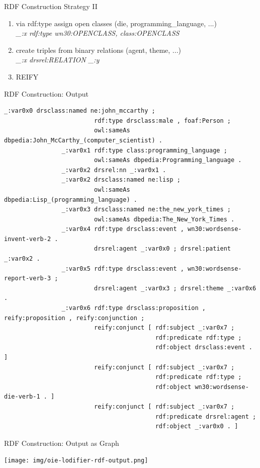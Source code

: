\documentclass[11pt]{beamer}
\begin{document}
		\begin{frame}{RDF Construction Strategy II}
			\begin{enumerate}							
				\item<1-3> via rdf:type assign open classes (die, programming\_language, ...)\\
					\textit{\_:x rdf:type wn30:OPENCLASS, class:OPENCLASS}
				\item<2-3> create triples from binary relations (agent, theme, ...)\\
					\textit{\_:x drsrel:RELATION \_:y}
				\item<3> REIFY
			\end{enumerate}
		\end{frame}

		\begin{frame}[fragile]{RDF Construction: Output}
			\begin{Verbatim}[fontsize=\tiny]
				_:var0x0 drsclass:named ne:john_mccarthy ;
				         rdf:type drsclass:male , foaf:Person ;
				         owl:sameAs dbpedia:John_McCarthy_(computer_scientist) .
				_:var0x1 rdf:type class:programming_language ;
				         owl:sameAs dbpedia:Programming_language .
				_:var0x2 drsrel:nn _:var0x1 .
				_:var0x2 drsclass:named ne:lisp ;
				         owl:sameAs dbpedia:Lisp_(programming_language) .
				_:var0x3 drsclass:named ne:the_new_york_times ;
				         owl:sameAs dbpedia:The_New_York_Times .
				_:var0x4 rdf:type drsclass:event , wn30:wordsense-invent-verb-2 .
				         drsrel:agent _:var0x0 ; drsrel:patient _:var0x2 .
				_:var0x5 rdf:type drsclass:event , wn30:wordsense-report-verb-3 ;
				         drsrel:agent _:var0x3 ; drsrel:theme _:var0x6 .
				_:var0x6 rdf:type drsclass:proposition , reify:proposition , reify:conjunction ;
				         reify:conjunct [ rdf:subject _:var0x7 ;
				                          rdf:predicate rdf:type ;
				                          rdf:object drsclass:event . ]
				         reify:conjunct [ rdf:subject _:var0x7 ;
				                          rdf:predicate rdf:type ;
				                          rdf:object wn30:wordsense-die-verb-1 . ]
				         reify:conjunct [ rdf:subject _:var0x7 ;
				                          rdf:predicate drsrel:agent ;
				                          rdf:object _:var0x0 . ]
			\end{Verbatim}
		\end{frame}
		
		\begin{frame}{RDF Construction: Output as Graph}
			\begin{center}
				\texttt{[image: img/oie-lodifier-rdf-output.png]}
			\end{center}
		\end{frame}
\end{document}
